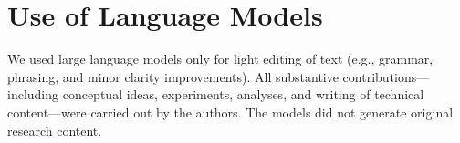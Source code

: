 \section{Use of Language Models}
We used large language models only for light editing of text (e.g., grammar, phrasing, and minor clarity improvements). All substantive contributions—including conceptual ideas, experiments, analyses, and writing of technical content—were carried out by the authors. The models did not generate original research content.